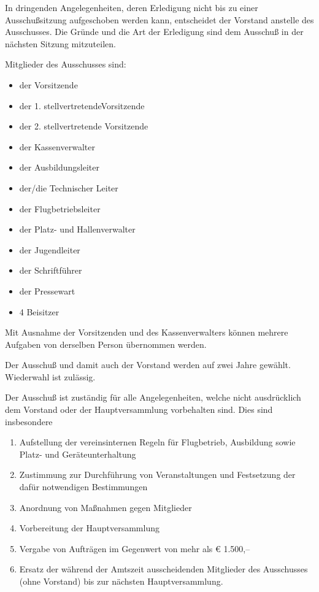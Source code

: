 \documentclass[10pt,a4paper,parskip=half]{scrartcl}
\begin{document}
\begin{contract}
    In dringenden Angelegenheiten,
    deren Erledigung nicht bis zu einer Ausschußsitzung aufgeschoben werden kann,
    entscheidet der Vorstand anstelle des Ausschusses.
    Die Gründe und die Art der Erledigung sind dem Ausschuß in der nächsten Sitzung mitzuteilen.
    
    Mitglieder des Ausschusses sind:
    \begin{itemize}[noitemsep]
      \item der Vorsitzende
      \item der 1. stellvertretendeVorsitzende
      \item der 2. stellvertretende Vorsitzende
      \item der Kassenverwalter
      \item der Ausbildungsleiter
      \item der/die Technischer Leiter
      \item der Flugbetriebsleiter
      \item der Platz- und Hallenverwalter
      \item der Jugendleiter
      \item der Schriftführer
      \item der Pressewart
      \item 4 Beisitzer
    \end{itemize}
    Mit Ausnahme der Vorsitzenden und des Kassenverwalters können mehrere Aufgaben von derselben Person übernommen werden.
    
    Der Ausschuß und damit auch der Vorstand werden auf zwei Jahre gewählt.
    Wiederwahl ist zulässig.
    
    Der Ausschuß ist zuständig für alle Angelegenheiten,
    welche nicht ausdrücklich dem Vorstand oder der Hauptversammlung vorbehalten sind.
    Dies sind insbesondere
    \begin{enumerate}[label=\alph*),noitemsep]
      \item Aufstellung der vereinsinternen Regeln für Flugbetrieb,
            Ausbildung sowie Platz- und Geräteunterhaltung
      \item Zustimmung zur Durchführung von Veranstaltungen und Festsetzung der dafür notwendigen Bestimmungen
      \item Anordnung von Maßnahmen gegen Mitglieder
      \item Vorbereitung der Hauptversammlung
      \item Vergabe von Aufträgen im Gegenwert von mehr als € 1.500,--
      \item Ersatz der während der Amtszeit ausscheidenden Mitglieder des Ausschusses (ohne Vorstand) bis zur nächsten Hauptversammlung.
    \end{enumerate}
    

\end{contract}
\end{document}
